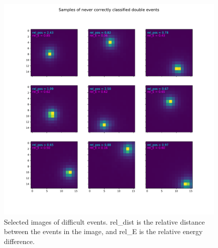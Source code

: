 \documentclass[12pt, notitlepage]{article}
\begin{document}
\begin{figure}
    \includegraphics[width=\textwidth]{figures/DenseNet201_nocorrect_samples}
    \caption{Selected images of difficult events. rel\_dist is the relative distance between
    the events in the image, and rel\_E is the relative energy difference.}
    \label{fig:nocorrect-samples}
\end{figure}

%
%
\end{document}
